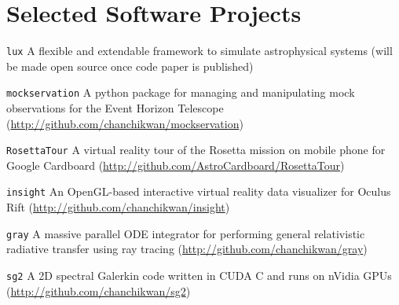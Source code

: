 \section*{Selected Software Projects}

\begin{Tlist}

\item[\texttt{lux}] A flexible and extendable framework to simulate
  astrophysical systems (will be made open source once code paper is
  published)

\item[\texttt{mockservation}] A python package for managing and
  manipulating mock observations for the Event Horizon Telescope
  (\url{http://github.com/chanchikwan/mockservation})

\item[\texttt{RosettaTour}] A virtual reality tour of the Rosetta
  mission on mobile phone for Google Cardboard
  (\url{http://github.com/AstroCardboard/RosettaTour})

\item[\texttt{insight}] An OpenGL-based interactive virtual reality
  data visualizer for Oculus Rift
  (\url{http://github.com/chanchikwan/insight})

\item[\texttt{gray}] A massive parallel ODE integrator for performing
  general relativistic radiative transfer using ray tracing
  (\url{http://github.com/chanchikwan/gray})

\item[\texttt{sg2}] A 2D spectral Galerkin code written in CUDA C and
  runs on nVidia GPUs (\url{http://github.com/chanchikwan/sg2})

\end{Tlist}


